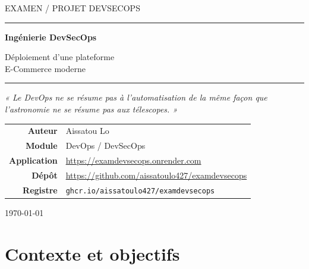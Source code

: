 \documentclass[11pt,a4paper]{article}
\begin{document}
\begin{titlepage}
\centering
\vspace*{2cm}

{\color{grisFonce}\large EXAMEN / PROJET DEVSECOPS\par}
\vspace{4mm}
{\color{bleuFonce}\rule{\linewidth}{1.2pt}}
\vspace{8mm}

{\Huge\bfseries Ingénierie DevSecOps\par}
\vspace{5mm}
{\LARGE Déploiement d'une plateforme\\E-Commerce moderne\par}

\vspace{6mm}
{\color{bleuFonce}\rule{\linewidth}{1.2pt}}

\vspace{14mm}
{\large\itshape « Le DevOps ne se résume pas à l'automatisation de la même
façon que l'astronomie ne se résume pas aux télescopes. »\par}

\vspace{18mm}
\begin{tabular}{rl}
  \textbf{Auteur} & Aissatou Lo\\[3pt]
  \textbf{Module} & DevOps / DevSecOps\\[3pt]
  \textbf{Application} & \url{https://examdevsecops.onrender.com}\\[3pt]
  \textbf{Dépôt} & \url{https://github.com/aissatoulo427/examdevsecops}\\[3pt]
  \textbf{Registre} & \texttt{ghcr.io/aissatoulo427/examdevsecops}\\
\end{tabular}

\vfill
{\color{grisFonce}\today}
\end{titlepage}

\tableofcontents
\newpage

\section{Contexte et objectifs}
\end{document}
